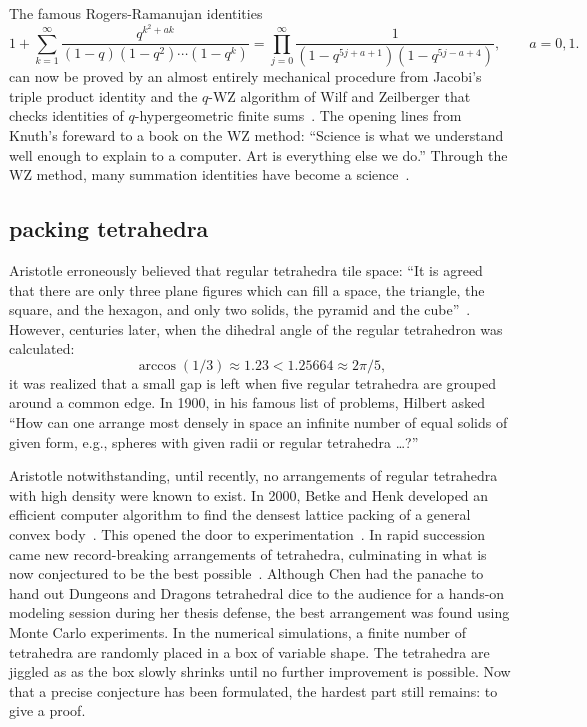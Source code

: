 \documentclass{llncs}
\begin{document}
The famous Rogers-Ramanujan identities
\[
1 + \sum_{k=1}^\infty \frac{q^{k^2+a k}}{(1-q)(1-q^2)\cdots (1-q^k)} = 
\prod_{j=0}^\infty \frac{1}{(1-q^{5j+a+1})(1- q^{5j - a +4})},
\qquad a = 0,1.
\]
can now be proved by an almost entirely mechanical procedure from
Jacobi's triple product identity and the $q$-WZ algorithm of Wilf and
Zeilberger that checks identities of $q$-hypergeometric finite
sums~\cite{PP94}.  The opening lines from Knuth's foreward to a book
on the WZ method: ``Science is what we understand well enough to
explain to a computer. Art is everything else we do.'' Through the WZ
method, many summation identities have become a science~\cite{PWZ}.


\subsection{packing  tetrahedra}

Aristotle erroneously believed that regular tetrahedra tile space:
``It is agreed that there are only three plane figures which can fill
a space, the triangle, the square, and the hexagon, and only two
solids, the pyramid and the cube''~\cite{Aristotle}.  However,
centuries later, when the dihedral angle of the regular tetrahedron
was calculated:
\[
\arccos(1/3) \approx 1.23 < 1.25664 \approx 2\pi/5,
\]
it was realized that a small gap is left when five regular tetrahedra
are grouped around a common edge.  In 1900, in his famous list of
problems, Hilbert asked ``How can one arrange most densely in space an
infinite number of equal solids of given form, e.g., spheres with
given radii or regular tetrahedra \dots?''

Aristotle notwithstanding, until recently, no arrangements of regular
tetrahedra with high density were known to exist.  In 2000, Betke and
Henk developed an efficient computer algorithm to find the densest
lattice packing of a general convex body~\cite{BH2000}.  This opened
the door to experimentation~\cite{Conway-2006}.  In rapid
succession came new record-breaking arrangements of tetrahedra,
culminating in what is now conjectured to be the best
possible~\cite{Chen-2010}.  Although Chen had the panache to hand out
Dungeons and Dragons tetrahedral dice to the audience for a hands-on
modeling session during her thesis defense, the best arrangement was found
using Monte Carlo experiments.  In the numerical simulations, a finite
number of tetrahedra are randomly placed in a box of variable shape.
The tetrahedra are jiggled as as the box slowly shrinks until no
further improvement is possible.  Now that a precise conjecture has
been formulated, the hardest part still remains: to give a
proof.  
\end{document}
